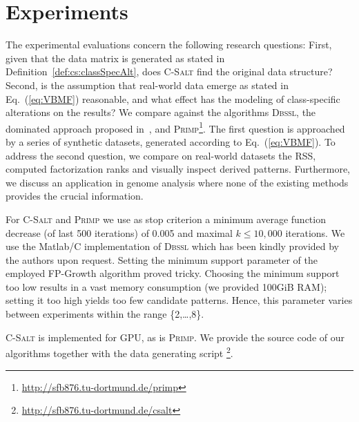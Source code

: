\section{Experiments}
The experimental evaluations concern the following research questions: First, given that the data matrix is generated as stated in Definition~\ref{def:cs:classSpecAlt}, does \textsc{C-Salt} find the original data structure?
Second, is the assumption that real-world data emerge as stated in Eq.~(\ref{eq:VBMF}) reasonable, and what effect has the modeling of class-specific alterations on the results?
We compare against the algorithms \textsc{Dbssl}, the dominated approach proposed in~\cite{miettienen2012finding}, and \textsc{Primp}\footnote{\url{http://sfb876.tu-dortmund.de/primp}}.
The first question is approached by a series of synthetic datasets, generated according to Eq.~(\ref{eq:VBMF}). To address the second question, we compare on real-world datasets the RSS, computed factorization ranks and visually inspect derived patterns.
Furthermore, we discuss an application in genome analysis where none of the existing methods provides the crucial information.

For \textsc{C-Salt} and \textsc{Primp} we use as stop criterion a minimum average function decrease (of last 500 iterations) of 0.005 and maximal $k\leq10,000$ iterations. We use the Matlab/C implementation of \textsc{Dbssl} which has been kindly provided by the authors upon request. Setting the minimum support parameter of the employed FP-Growth algorithm proved tricky. Choosing the minimum support too low results in a vast memory consumption (we provided 100GiB RAM); setting it too high yields too few candidate patterns. Hence, this parameter varies between experiments within the range \{2,\ldots,8\}.

\textsc{C-Salt} is implemented for GPU, as is \textsc{Primp}. We provide the source code of our algorithms together with the data generating script \footnote{\url{http://sfb876.tu-dortmund.de/csalt}}.
